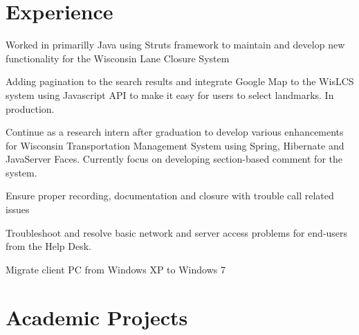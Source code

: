 \documentclass[]{deedy-resume-openfont}
\begin{document}
\begin{minipage}[t]{0.66\textwidth} 


\section{Experience}

\vspace{\topsep} %
\begin{tightemize}
\item Worked in primarilly Java using Struts framework to maintain and develop new functionality for the Wisconsin Lane Closure System
\item Adding pagination to the search results and integrate Google Map to the WisLCS system using Javascript API to make it easy for users to select landmarks. In production.
\item Continue as a research intern after graduation to develop various enhancements for Wisconsin Transportation Management System using Spring, Hibernate and JavaServer Faces. Currently focus on developing section-based comment for the system.
\end{tightemize}
\sectionsep

\begin{tightemize}
\item Ensure proper recording, documentation and closure with trouble call related issues
\item Troubleshoot and resolve basic network and server access problems for end-users from the Help Desk. 
\item Migrate client PC from Windows XP to Windows 7
\end{tightemize}
\sectionsep


\section{Academic Projects}


\end{minipage}
\end{document}
